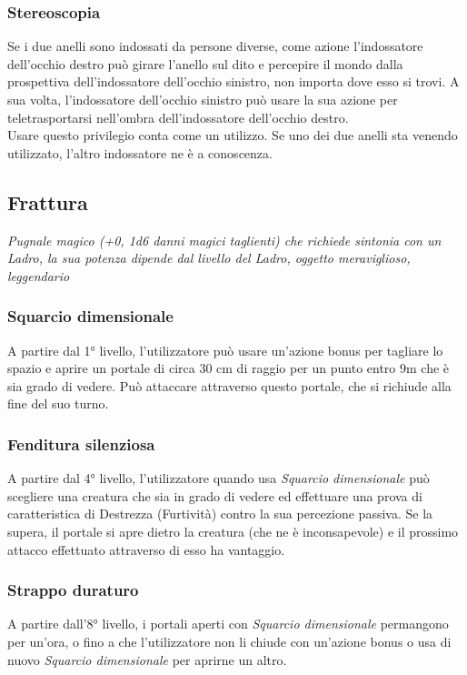 \subsubsection{Stereoscopia}
Se i due anelli sono indossati da persone diverse, come azione l'indossatore dell'occhio destro può girare l'anello sul dito e percepire il mondo dalla prospettiva dell'indossatore dell'occhio sinistro, non importa dove esso si trovi. A sua volta, l'indossatore dell'occhio sinistro può usare la sua azione per teletrasportarsi nell'ombra dell'indossatore dell'occhio destro. \\ Usare questo privilegio conta come un utilizzo. Se uno dei due anelli sta venendo utilizzato, l'altro indossatore ne è a conoscenza.

\subsection{Frattura}
\textit{Pugnale magico (+0, 1d6 danni magici taglienti) che richiede sintonia con un Ladro, la sua potenza dipende dal livello del Ladro, oggetto meraviglioso, leggendario}

\subsubsection{Squarcio dimensionale}
A partire dal 1° livello, l'utilizzatore può usare un'azione bonus per tagliare lo spazio e aprire un portale di circa 30 cm di raggio per un punto entro 9m che è sia grado di vedere. Può attaccare attraverso questo portale, che si richiude alla fine del suo turno.

\subsubsection{Fenditura silenziosa}
A partire dal 4° livello, l'utilizzatore quando usa \textit{Squarcio dimensionale} può scegliere una creatura che sia in grado di vedere ed effettuare una prova di caratteristica di Destrezza (Furtività) contro la sua percezione passiva. Se la supera, il portale si apre dietro la creatura (che ne è inconsapevole) e il prossimo attacco effettuato attraverso di esso ha vantaggio.

\subsubsection{Strappo duraturo}
A partire dall'8° livello, i portali aperti con \textit{Squarcio dimensionale} permangono per un'ora, o fino a che l'utilizzatore non li chiude con un'azione bonus o usa di nuovo \textit{Squarcio dimensionale} per aprirne un altro.

